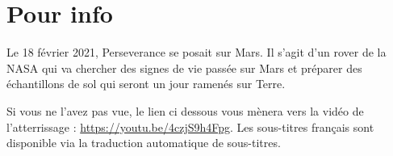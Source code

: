 \documentclass[12pt,a4paper]{article}
\begin{document}
\section*{Pour info}

Le 18 février 2021, Perseverance se posait sur Mars.
Il s'agit d'un rover de la NASA qui va chercher des signes de vie passée sur Mars et préparer des échantillons de sol qui seront un jour ramenés sur Terre.

Si vous ne l'avez pas vue, le lien ci dessous vous mènera vers la vidéo de l'atterrissage : \href{https://youtu.be/4czjS9h4Fpg}{https://youtu.be/4czjS9h4Fpg}.
Les sous-titres français sont disponible via la traduction automatique de sous-titres.
\end{document}
